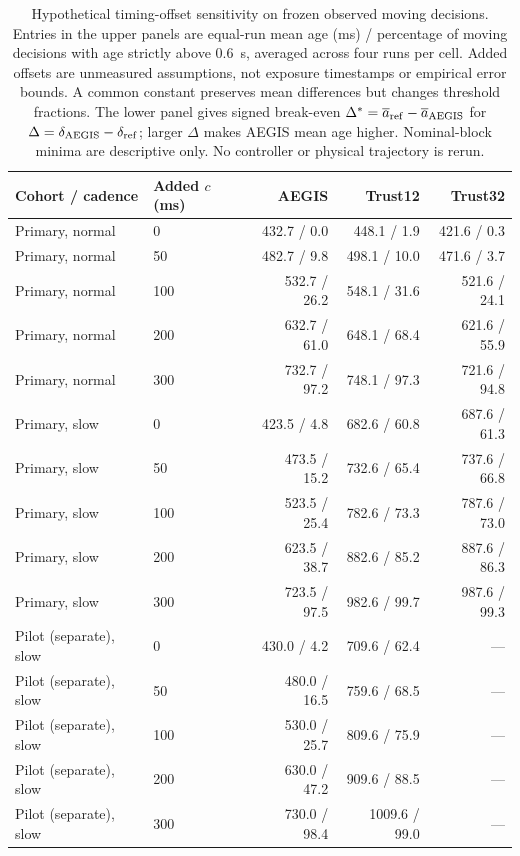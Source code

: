 \begin{table}[H]
\centering\footnotesize
\caption{Hypothetical timing-offset sensitivity on frozen observed moving decisions. Entries in the upper panels are equal-run mean age (ms) / percentage of moving decisions with age strictly above 0.6~s, averaged across four runs per cell. Added offsets are unmeasured assumptions, not exposure timestamps or empirical error bounds. A common constant preserves mean differences but changes threshold fractions. The lower panel gives signed break-even $\Delta^*=\overline a_{\rm ref}-\overline a_{\rm AEGIS}$ for $\Delta=\delta_{\rm AEGIS}-\delta_{\rm ref}$; larger $\Delta$ makes AEGIS mean age higher. Nominal-block minima are descriptive only. No controller or physical trajectory is rerun.}\label{tab:proxy-offset}
\begin{tabular}{llrrr}
\toprule
Cohort / cadence & Added $c$ (ms) & AEGIS & Trust12 & Trust32\\
\midrule
Primary, normal & 0 & 432.7 / 0.0 & 448.1 / 1.9 & 421.6 / 0.3\\
Primary, normal & 50 & 482.7 / 9.8 & 498.1 / 10.0 & 471.6 / 3.7\\
Primary, normal & 100 & 532.7 / 26.2 & 548.1 / 31.6 & 521.6 / 24.1\\
Primary, normal & 200 & 632.7 / 61.0 & 648.1 / 68.4 & 621.6 / 55.9\\
Primary, normal & 300 & 732.7 / 97.2 & 748.1 / 97.3 & 721.6 / 94.8\\
Primary, slow & 0 & 423.5 / 4.8 & 682.6 / 60.8 & 687.6 / 61.3\\
Primary, slow & 50 & 473.5 / 15.2 & 732.6 / 65.4 & 737.6 / 66.8\\
Primary, slow & 100 & 523.5 / 25.4 & 782.6 / 73.3 & 787.6 / 73.0\\
Primary, slow & 200 & 623.5 / 38.7 & 882.6 / 85.2 & 887.6 / 86.3\\
Primary, slow & 300 & 723.5 / 97.5 & 982.6 / 99.7 & 987.6 / 99.3\\
\midrule
Pilot (separate), slow & 0 & 430.0 / 4.2 & 709.6 / 62.4 & ---\\
Pilot (separate), slow & 50 & 480.0 / 16.5 & 759.6 / 68.5 & ---\\
Pilot (separate), slow & 100 & 530.0 / 25.7 & 809.6 / 75.9 & ---\\
Pilot (separate), slow & 200 & 630.0 / 47.2 & 909.6 / 88.5 & ---\\
Pilot (separate), slow & 300 & 730.0 / 98.4 & 1009.6 / 99.0 & ---\\

\end{tabular}
\end{table}
